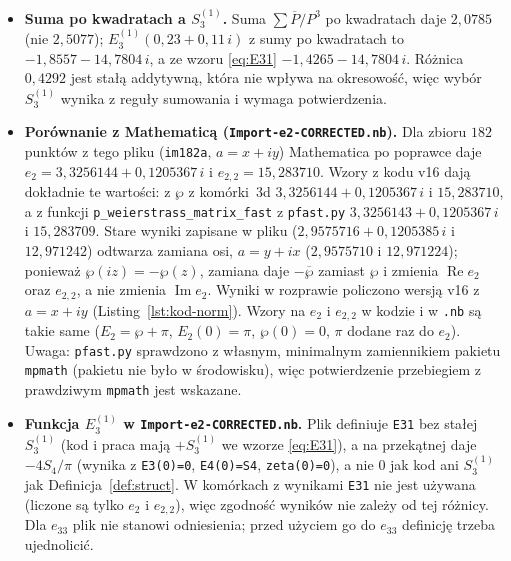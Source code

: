 \documentclass[12pt,a4paper,twoside,openright]{report}
\theoremstyle{definition}
\theoremstyle{remark}
\newcommand{\cc}[1]{\overline{#1}}
\newcommand{\oran}[1]{{\color{orange}#1}}
\renewcommand{\Re}{\operatorname{Re}}
\renewcommand{\Im}{\operatorname{Im}}
\begin{document}
\begin{enumerate}[nosep]
{\begin{itemize}[nosep]
\item \textbf{Suma po kwadratach a $S_3^{(1)}$.} Suma $\sum\cc P/P^3$ po kwadratach daje $2{,}0785$ (nie $2{,}5077$); $E_3^{(1)}(0{,}23+0{,}11\,i)$ z sumy po kwadratach to $-1{,}8557-14{,}7804\,i$, a ze wzoru \eqref{eq:E31} $-1{,}4265-14{,}7804\,i$. Różnica $0{,}4292$ jest stałą addytywną, która nie wpływa na okresowość, więc wybór $S_3^{(1)}$ wynika z reguły sumowania i wymaga potwierdzenia.
\item \oran{\textbf{Porównanie z Mathematicą (\texttt{Import-e2-CORRECTED.nb}).} Dla zbioru $182$ punktów z tego pliku (\texttt{im182a}, $a=x+iy$) Mathematica po poprawce daje $e_2=3{,}3256144+0{,}1205367\,i$ i $e_{2,2}=15{,}283710$. Wzory z kodu v16 dają dokładnie te wartości: z $\wp$ z komórki~3d $3{,}3256144+0{,}1205367\,i$ i $15{,}283710$, a z funkcji \texttt{p\_weierstrass\_matrix\_fast} z \texttt{pfast.py} $3{,}3256143+0{,}1205367\,i$ i $15{,}283709$. Stare wyniki zapisane w pliku ($2{,}9575716+0{,}1205385\,i$ i $12{,}971242$) odtwarza zamiana osi, $a=y+ix$ ($2{,}9575710$ i $12{,}971224$); ponieważ $\wp(iz)=-\wp(z)$, zamiana daje $-\overline{\wp}$ zamiast $\wp$ i zmienia $\Re e_2$ oraz $e_{2,2}$, a nie zmienia $\Im e_2$. Wyniki w rozprawie policzono wersją v16 z $a=x+iy$ (Listing~\ref{lst:kod-norm}). Wzory na $e_2$ i $e_{2,2}$ w kodzie i w \texttt{.nb} są takie same ($E_2=\wp+\pi$, $E_2(0)=\pi$, $\wp(0)=0$, $\pi$ dodane raz do $e_2$). Uwaga: \texttt{pfast.py} sprawdzono z własnym, minimalnym zamiennikiem pakietu \texttt{mpmath} (pakietu nie było w środowisku), więc potwierdzenie przebiegiem z prawdziwym \texttt{mpmath} jest wskazane.}
\item \oran{\textbf{Funkcja $E_3^{(1)}$ w \texttt{Import-e2-CORRECTED.nb}.} Plik definiuje \texttt{E31} bez stałej $S_3^{(1)}$ (kod i praca mają $+S_3^{(1)}$ we wzorze \eqref{eq:E31}), a na przekątnej daje $-4S_4/\pi$ (wynika z \texttt{E3(0)=0}, \texttt{E4(0)=S4}, \texttt{zeta(0)=0}), a nie $0$ jak kod ani $S_3^{(1)}$ jak Definicja~\ref{def:struct}. W komórkach z wynikami \texttt{E31} nie jest używana (liczone są tylko $e_2$ i $e_{2,2}$), więc zgodność wyników nie zależy od tej różnicy. Dla $e_{33}$ plik nie stanowi odniesienia; przed użyciem go do $e_{33}$ definicję trzeba ujednolicić.}
\end{itemize}}
\end{enumerate}

\clearpage
{}
{}


\end{document}
